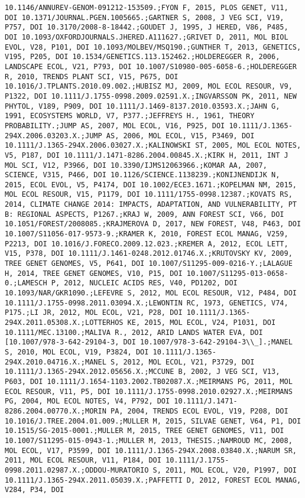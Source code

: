 \documentclass[]{article}
\begin{document}
\begin{verbatim}
10.1146/ANNUREV-GENOM-091212-153509.;FYON F, 2015, PLOS GENET, V11, DOI 10.1371/JOURNAL.PGEN.1005665.;GARTNER S, 2008, J VEG SCI, V19, P757, DOI 10.3170/2008-8-18442.;GOUDET J, 1995, J HERED, V86, P485, DOI 10.1093/OXFORDJOURNALS.JHERED.A111627.;GRIVET D, 2011, MOL BIOL EVOL, V28, P101, DOI 10.1093/MOLBEV/MSQ190.;GUNTHER T, 2013, GENETICS, V195, P205, DOI 10.1534/GENETICS.113.152462.;HOLDEREGGER R, 2006, LANDSCAPE ECOL, V21, P793, DOI 10.1007/S10980-005-6058-6.;HOLDEREGGER R, 2010, TRENDS PLANT SCI, V15, P675, DOI 10.1016/J.TPLANTS.2010.09.002.;HUBISZ MJ, 2009, MOL ECOL RESOUR, V9, P1322, DOI 10.1111/J.1755-0998.2009.02591.X.;INGVARSSON PK, 2011, NEW PHYTOL, V189, P909, DOI 10.1111/J.1469-8137.2010.03593.X.;JAHN G, 1991, ECOSYSTEMS WORLD, V7, P377.;JEFFREYS H., 1961, THEORY PROBABILITY.;JUMP AS, 2007, MOL ECOL, V16, P925, DOI 10.1111/J.1365-294X.2006.03203.X.;JUMP AS, 2006, MOL ECOL, V15, P3469, DOI 10.1111/J.1365-294X.2006.03027.X.;KALINOWSKI ST, 2005, MOL ECOL NOTES, V5, P187, DOI 10.1111/J.1471-8286.2004.00845.X.;KIRK H, 2011, INT J MOL SCI, V12, P3966, DOI 10.3390/IJMS12063966.;KOMAR AA, 2007, SCIENCE, V315, P466, DOI 10.1126/SCIENCE.1138239.;KONIJNENDIJK N, 2015, ECOL EVOL, V5, P4174, DOI 10.1002/ECE3.1671.;KOPELMAN NM, 2015, MOL ECOL RESOUR, V15, P1179, DOI 10.1111/1755-0998.12387.;KOVATS RS, 2014, CLIMATE CHANGE 2014: IMPACTS, ADAPTATION, AND VULNERABILITY, PT B: REGIONAL ASPECTS, P1267.;KRAJ W, 2009, ANN FOREST SCI, V66, DOI 10.1051/FOREST/2008085.;KRAJMEROVA D, 2017, NEW FOREST, V48, P463, DOI 10.1007/S11056-017-9573-9.;KRAMER K, 2010, FOREST ECOL MANAG, V259, P2213, DOI 10.1016/J.FORECO.2009.12.023.;KREMER A, 2012, ECOL LETT, V15, P378, DOI 10.1111/J.1461-0248.2012.01746.X.;KRUTOVSKY KV, 2009, TREE GENET GENOMES, V5, P641, DOI 10.1007/S11295-009-0216-Y.;LALAGUE H, 2014, TREE GENET GENOMES, V10, P15, DOI 10.1007/S11295-013-0658-0.;LAMESCH P, 2012, NUCLEIC ACIDS RES, V40, PD1202, DOI 10.1093/NAR/GKR1090.;LEFEVRE S, 2012, MOL ECOL RESOUR, V12, P484, DOI 10.1111/J.1755-0998.2011.03094.X.;LEWONTIN RC, 1973, GENETICS, V74, P175.;LI JR, 2012, MOL ECOL, V21, P28, DOI 10.1111/J.1365-294X.2011.05308.X.;LOTTERHOS KE, 2015, MOL ECOL, V24, P1031, DOI 10.1111/MEC.13100.;MALIVA R., 2012, ARID LANDS WATER EVA, DOI [10.1007/978-3-642-29104-3, DOI 10.1007/978-3-642-29104-3\\_].;MANEL S, 2010, MOL ECOL, V19, P3824, DOI 10.1111/J.1365-294X.2010.04716.X.;MANEL S, 2012, MOL ECOL, V21, P3729, DOI 10.1111/J.1365-294X.2012.05656.X.;MCCUNE B, 2002, J VEG SCI, V13, P603, DOI 10.1111/J.1654-1103.2002.TB02087.X.;MEIRMANS PG, 2011, MOL ECOL RESOUR, V11, P5, DOI 10.1111/J.1755-0998.2010.02927.X.;MEIRMANS PG, 2004, MOL ECOL NOTES, V4, P792, DOI 10.1111/J.1471-8286.2004.00770.X.;MORIN PA, 2004, TRENDS ECOL EVOL, V19, P208, DOI 10.1016/J.TREE.2004.01.009.;MULLER M, 2015, SILVAE GENET, V64, P1, DOI 10.1515/SG-2015-0001.;MULLER M, 2015, TREE GENET GENOMES, V11, DOI 10.1007/S11295-015-0943-1.;MULLER M, 2013, THESIS.;NAMROUD MC, 2008, MOL ECOL, V17, P3599, DOI 10.1111/J.1365-294X.2008.03840.X.;NARUM SR, 2011, MOL ECOL RESOUR, V11, P184, DOI 10.1111/J.1755-0998.2011.02987.X.;ODDOU-MURATORIO S, 2011, MOL ECOL, V20, P1997, DOI 10.1111/J.1365-294X.2011.05039.X.;PAFFETTI D, 2012, FOREST ECOL MANAG, V284, P34, DOI 
\end{verbatim}
\end{document}
